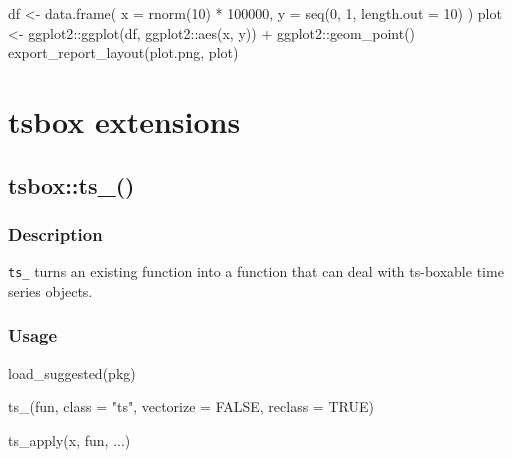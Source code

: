 \documentclass[
  letterpaper,
  DIV=11,
  numbers=noendperiod]{scrreport}
\newenvironment{Shaded}{\begin{snugshade}}{\end{snugshade}}
\newcommand{\AttributeTok}[1]{\textcolor[rgb]{0.40,0.45,0.13}{#1}}
\newcommand{\ConstantTok}[1]{\textcolor[rgb]{0.56,0.35,0.01}{#1}}
\newcommand{\DecValTok}[1]{\textcolor[rgb]{0.68,0.00,0.00}{#1}}
\newcommand{\FunctionTok}[1]{\textcolor[rgb]{0.28,0.35,0.67}{#1}}
\newcommand{\NormalTok}[1]{\textcolor[rgb]{0.00,0.23,0.31}{#1}}
\newcommand{\OtherTok}[1]{\textcolor[rgb]{0.00,0.23,0.31}{#1}}
\newcommand{\SpecialCharTok}[1]{\textcolor[rgb]{0.37,0.37,0.37}{#1}}
\newcommand{\StringTok}[1]{\textcolor[rgb]{0.13,0.47,0.30}{#1}}
\begin{document}
\begin{Shaded}
\begin{Highlighting}[]
\NormalTok{df }\OtherTok{\textless{}{-}} \FunctionTok{data.frame}\NormalTok{(}
  \AttributeTok{x =} \FunctionTok{rnorm}\NormalTok{(}\DecValTok{10}\NormalTok{) }\SpecialCharTok{*} \DecValTok{100000}\NormalTok{,}
  \AttributeTok{y =} \FunctionTok{seq}\NormalTok{(}\DecValTok{0}\NormalTok{, }\DecValTok{1}\NormalTok{, }\AttributeTok{length.out =} \DecValTok{10}\NormalTok{)}
\NormalTok{)}
\NormalTok{plot }\OtherTok{\textless{}{-}}\NormalTok{ ggplot2}\SpecialCharTok{::}\FunctionTok{ggplot}\NormalTok{(df, ggplot2}\SpecialCharTok{::}\FunctionTok{aes}\NormalTok{(x, y)) }\SpecialCharTok{+}\NormalTok{ ggplot2}\SpecialCharTok{::}\FunctionTok{geom\_point}\NormalTok{()}
\FunctionTok{export\_report\_layout}\NormalTok{(}\StringTok{\textquotesingle{}plot.png\textquotesingle{}}\NormalTok{, plot)}
\end{Highlighting}
\end{Shaded}

\section{tsbox extensions}\label{tsbox-extensions}

\subsection{tsbox::ts\_()}\label{tsboxts_}

\subsubsection{Description}\label{description-82}

\texttt{ts\_} turns an existing function into a function that can deal
with ts-boxable time series objects.

\subsubsection{Usage}\label{usage-82}

\begin{Shaded}
\begin{Highlighting}[]
\FunctionTok{load\_suggested}\NormalTok{(pkg)}

\FunctionTok{ts\_}\NormalTok{(fun, }\AttributeTok{class =} \StringTok{"ts"}\NormalTok{, }\AttributeTok{vectorize =} \ConstantTok{FALSE}\NormalTok{, }\AttributeTok{reclass =} \ConstantTok{TRUE}\NormalTok{)}

\FunctionTok{ts\_apply}\NormalTok{(x, fun, ...)}
\end{Highlighting}
\end{Shaded}
\end{document}
